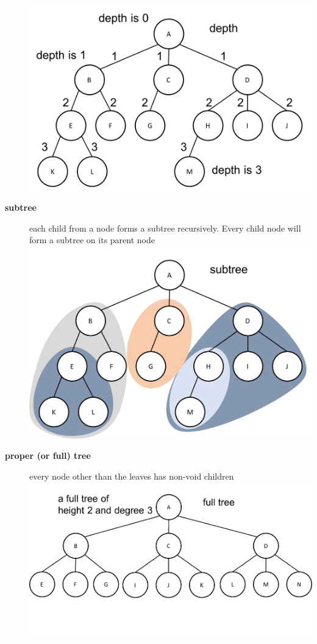 \documentclass[newPxFont,sthlmFooter,nooffset]{beamer}
\begin{document}
\begin{frame}[t, allowframebreaks]
\begin{description}
\includegraphics[height=0.3\textheight]{./figures/fig02_def_depth.png}
  \item[\textbf{subtree}] each child from a node forms a subtree
    recursively. Every child node will form a subtree on its parent
    node\\
\includegraphics[height=0.3\textheight]{./figures/fig02_def_subtree.png}
\item[\textbf{proper (or full) tree}] every node other than the leaves has non-void children\\
\includegraphics[height=0.3\textheight]{./figures/fig02_def_full.png}

\end{description}
\end{frame}
\end{document}
